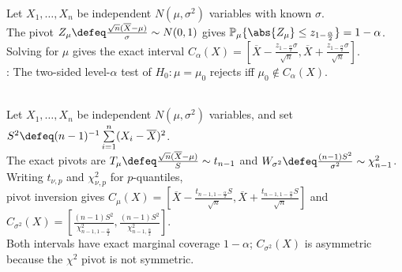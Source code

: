 \begin{example} \label{ex:normal-mean-known-variance-confidence-interval} \\
Let $X_1,\ldots,X_n$ be independent $N(\mu,\sigma^2)$ variables with known $\sigma$.\\
The pivot $Z_\mu\defeq\frac{\sqrt n(\overline{X}-\mu)}{\sigma}\sim N(0,1)$ gives $\mathbb{P}_\mu\{\abs{Z_\mu}\leq z_{1-\frac{\alpha}{2}}\}=1-\alpha$.\\
Solving for $\mu$ gives the exact interval $C_\alpha(X)=[\overline{X}-\frac{z_{1-\frac{\alpha}{2}}\sigma}{\sqrt n},\overline{X}+\frac{z_{1-\frac{\alpha}{2}}\sigma}{\sqrt n}]$.\\
: The two-sided level-$\alpha$ test of $H_0:\mu=\mu_0$ rejects iff $\mu_0\notin C_\alpha(X)$.
\end{example}

\begin{example} \label{ex:normal-mean-variance-exact-confidence-intervals} \\
Let $X_1,\ldots,X_n$ be independent $N(\mu,\sigma^2)$ variables, and set $S^2\defeq(n-1)^{-1}\sum\limits_{i=1}^n(X_i-\overline{X})^2$.\\
The exact pivots are $T_\mu\defeq\frac{\sqrt n(\overline{X}-\mu)}{S}\sim t_{n-1}$ and $W_{\sigma^2}\defeq\frac{(n-1)S^2}{\sigma^2}\sim\chi^2_{n-1}$. Writing $t_{\nu,p}$ and $\chi^2_{\nu,p}$ for $p$-quantiles,\\
pivot inversion gives $C_\mu(X)=[\overline{X}-\frac{t_{n-1,1-\frac{\alpha}{2}}S}{\sqrt n},\overline{X}+\frac{t_{n-1,1-\frac{\alpha}{2}}S}{\sqrt n}]$ and $C_{\sigma^2}(X)=[\frac{(n-1)S^2}{\chi^2_{n-1,1-\frac{\alpha}{2}}},\frac{(n-1)S^2}{\chi^2_{n-1,\frac{\alpha}{2}}}]$.\\
Both intervals have exact marginal coverage $1-\alpha$; $C_{\sigma^2}(X)$ is asymmetric because the $\chi^2$ pivot is not symmetric.
\end{example}
